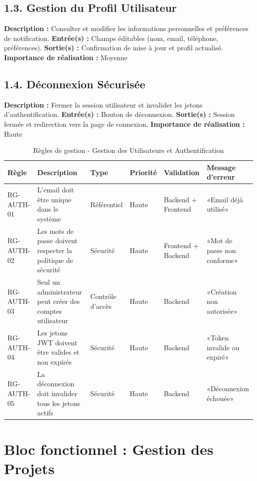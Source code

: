 \subsection{1.3. Gestion du Profil Utilisateur}
\textbf{Description :} Consulter et modifier les informations personnelles et préférences de notification.
\textbf{Entrée(s) :} Champs éditables (nom, email, téléphone, préférences).
\textbf{Sortie(s) :} Confirmation de mise à jour et profil actualisé.
\textbf{Importance de réalisation :} Moyenne

\subsection{1.4. Déconnexion Sécurisée}
\textbf{Description :} Fermer la session utilisateur et invalider les jetons d'authentification.
\textbf{Entrée(s) :} Bouton de déconnexion.
\textbf{Sortie(s) :} Session fermée et redirection vers la page de connexion.
\textbf{Importance de réalisation :} Haute

\begin{table}[H]
\centering
\footnotesize
\begin{tabular}{|p{1.5cm}|p{3.5cm}|p{1.5cm}|p{1.5cm}|p{2cm}|p{2.5cm}|}
\hline
\textbf{Règle} & \textbf{Description} & \textbf{Type} & \textbf{Priorité} & \textbf{Validation} & \textbf{Message d'erreur} \\
\hline
RG-AUTH-01 & L'email doit être unique dans le système & Référentiel & Haute & Backend + Frontend & «Email déjà utilisé» \\
\hline
RG-AUTH-02 & Les mots de passe doivent respecter la politique de sécurité & Sécurité & Haute & Frontend + Backend & «Mot de passe non conforme» \\
\hline
RG-AUTH-03 & Seul un administrateur peut créer des comptes utilisateur & Contrôle d'accès & Haute & Backend & «Création non autorisée» \\
\hline
RG-AUTH-04 & Les jetons JWT doivent être valides et non expirés & Sécurité & Haute & Backend & «Token invalide ou expiré» \\
\hline
RG-AUTH-05 & La déconnexion doit invalider tous les jetons actifs & Sécurité & Haute & Backend & «Déconnexion échouée» \\
\hline
\end{tabular}
\caption{Règles de gestion - Gestion des Utilisateurs et Authentification}
\label{tab:rg_auth}
\end{table}

\section{Bloc fonctionnel : Gestion des Projets}

